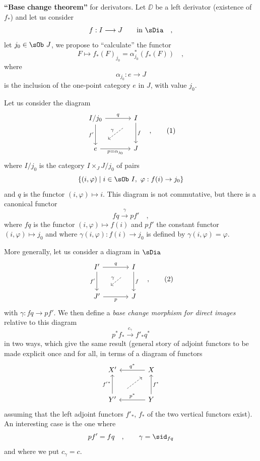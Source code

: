 \textbf{``Base change theorem''} for derivators. Let $\DD$ be a left derivator (existence of $f_*$) and let us consider
\[ f : I \longrightarrow J \qquad \text{in } \sDia \quad , \]
let $j_0 \in \sOb\ J$, we propose to ``calculate'' the functor
\[ F \mapsto f_*(F)_{j_0} = \alpha^*_{j_0}(f_*(F)) \quad , \]
where
\[ \alpha_{j_0} : e \longrightarrow J \]
is the inclusion of the one-point category $e$ in $J$, with value $j_0$.

Let us consider the diagram
\[
\begin{tikzcd}[row sep=large, column sep=large]
I/j_0 \arrow[r, "q"] \arrow[d, "f'"'] & I \arrow[d, "f"] \\
e \arrow[r, "p = \alpha_{j_0}"'] & J
\arrow[from=1-2, to=2-1, dashed, shorten <=14pt, shorten >=14pt, "\gamma"']
\end{tikzcd}
\quad ,
\tag*{(1)}
\]
where $I/j_0$ is the category $I \times_J J/j_0$ of pairs
\[ \{(i,\varphi) \mid i \in \sOb\ I,\ \varphi : f(i) \to j_0\} \]
and $q$ is the functor $(i,\varphi) \mapsto i$. This diagram is not commutative, but there is a canonical functor 
\[ fq \xrightarrow{\gamma} pf' \quad , \]
where $fq$ is the functor $(i,\varphi) \mapsto f(i)$ and $pf'$ the constant functor $(i,\varphi) \mapsto j_0$ and where $\gamma(i,\varphi) : f(i) \to j_0$ is defined by $\gamma(i,\varphi) = \varphi$.

More generally, let us consider a diagram in $\sDia$
\[
\begin{tikzcd}[row sep=large, column sep=large]
I' \arrow[r, "q"] \arrow[d, "f'"'] & I \arrow[d, "f"] \\
J' \arrow[r, "p"'] & J
\arrow[from=1-2, to=2-1, dashed, shorten <=14pt, shorten >=14pt, "\gamma"']
\end{tikzcd}
\quad ,
\tag*{(2)}
\]
with $\gamma : fq \to pf'$. We then define a \textit{base change morphism for direct images} relative to this diagram
\[ p^* f_* \xrightarrow{c_\gamma} f'_* q^* \]
in two ways, which give the same result (general story of adjoint functors to be made explicit once and for all, in terms of a diagram of functors
\[
\begin{tikzcd}[row sep=large, column sep=large]
X' & X \arrow[l, "q^*"'] \\
Y' \arrow[u, "{f'}^*"] & Y \arrow[l, "p^*"'] \arrow[u, "f^*"']
\arrow[from=2-1, to=1-2, dashed, shorten <=14pt, shorten >=6pt]
\end{tikzcd}
\]
assuming that the left adjoint functors $f'_*$, $f_*$ of the two vertical functors exist). An interesting case is the one where
\[ pf' = fq \quad , \qquad \gamma = \sid_{fq} \]
and where we put $c_\gamma = c$.

